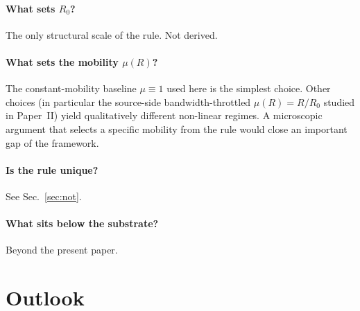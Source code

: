 \documentclass[11pt,a4paper]{article}
\begin{document}
\paragraph{What sets $R_0$?} The only structural scale of the
rule. Not derived.

\paragraph{What sets the mobility $\mu(R)$?} The
constant-mobility baseline $\mu \equiv 1$ used here is the
simplest choice. Other choices (in particular the source-side
bandwidth-throttled $\mu(R) = R/R_0$ studied in Paper~II)
yield qualitatively different non-linear regimes. A
microscopic argument that selects a specific mobility from the
rule would close an important gap of the framework.

\paragraph{Is the rule unique?} See Sec.~\ref{sec:not}.

\paragraph{What sits below the substrate?} Beyond the present
paper.

\section{Outlook}
\label{sec:outlook}
\end{document}
